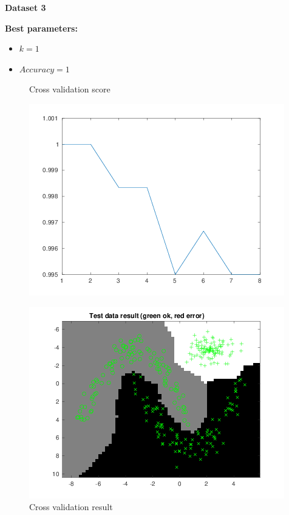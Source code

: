 \documentclass[a4paper,12pt]{article}
\begin{document}
\noindent \textbf{Dataset 3}

\textbf{Best parameters:}
\begin{itemize}
\item $k = 1$
\item $Accuracy = 1$
\end{itemize}

\begin{figure}[H]
\centering
  \begin{minipage}[]{0.49\textwidth}
  \caption{Cross validation score}\label{fig:kNN-3-cv-score}
  \includegraphics[width=\textwidth]{figures/kNN_3_cv_score.png}
  \end{minipage}
  \begin{minipage}[]{0.49\textwidth}
  \caption{Cross validation result}\label{fig:kNN-3-cv}
  \includegraphics[width=\textwidth]{figures/kNN_3_cv.png}
  \end{minipage}
\end{figure}
\end{document}
